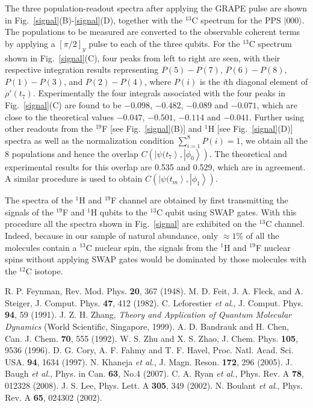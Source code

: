 \documentclass[twocolumn,showpacs,twoside,10pt,prl]{revtex4}
\begin{document}
 The three population-readout spectra after applying the GRAPE pulse
 are shown in Fig.~\ref{signal}(B)-\ref{signal}(D), together with the $^{13}$C spectrum for the PPS $|000\rangle$.
 The populations to be measured are converted to the observable coherent terms by applying a $[\pi/2]_y$ pulse to each of the three qubits.   For the $^{13}$C spectrum shown in Fig.~\ref{signal}(C), four peaks from left to right are seen, with their respective integration results representing $P(5)-P(7)$, $P(6)-P(8)$, $P(1)-P(3)$, and $P(2)-P(4)$, where $P(i)$ is the  \emph{i}th diagonal element of $\rho'(t_7)$.  Experimentally the four integrals associated with the four peaks in Fig.~\ref{signal}(C) are found to be $-0.098$, $-0.482$, $-0.089$ and $-0.071$, which are close to the theoretical values $-0.047$, $-0.501$, $-0.114$ and $-0.041$.
 Further using other readouts from the $^{19}$F [see Fig.~\ref{signal}(B)] and $^1$H [see Fig.~\ref{signal}(D)] spectra as well as the normalization condition $\sum_{i=1}^{8} {P}({i})=1$, we obtain all the 8 populations and hence the overlap $C(\left\vert \psi(t_{7} \right\rangle,\left\vert \phi_{0} \right\rangle)$.  The theoretical and experimental results for this overlap are 0.535 and 0.529, which are in agreement.
 A similar procedure is used to obtain $C(\left\vert \psi(t_{m} \right\rangle,\left\vert \phi_{1} \right\rangle)$.

 The spectra of the ${}^{1}$H and ${}^{19}$F channel are obtained by first transmitting the signals of the $^{19}$F and $^1$H qubits to the $^{13}$C qubit using SWAP gates. With this procedure all the spectra shown in Fig.~\ref{signal} are exhibited on the $^{13}$C channel.  Indeed, because
 in our sample of natural abundance, only $\approx 1\%$ of all the molecules contain a ${}^{13}$C nuclear spin,
 the signals from the ${}^{1}$H and ${}^{19}$F nuclear spins  without applying SWAP gates would be
  dominated by those molecules with the ${}^{12}$C isotope.




\begin{thebibliography}{99}
 R. P. Feynman, Rev. Mod. Phys. \textbf{20}, 367 (1948).
 M. D. Feit, J. A. Fleck, and A. Steiger, J. Comput. Phys. \textbf{47}, 412 (1982).
 C. Leforestier \emph{et al}., J. Comput. Phys. \textbf{94}, 59 (1991).
 J. Z. H. Zhang, {\it Theory and Application of Quantum Molecular Dynamics}
 (World Scientific, Singapore, 1999).
 A. D. Bandrauk and H. Chen, Can. J. Chem. {\bf 70}, 555 (1992).
 W. S. Zhu and X. S. Zhao, J. Chem. Phys. {\bf 105}, 9536 (1996).
 D. G. Cory, A. F. Fahmy and T. F. Havel, Proc. Natl. Acad. Sci. USA. \textbf{94}, 1634 (1997).
 N. Khaneja \emph{et al.}, J. Magn. Reson. \textbf{172}, 296 (2005).
 J. Baugh \emph{et al.}, Phys. in Can. \textbf{63}, No.4
(2007).
 C. A. Ryan \emph{et al.}, Phys. Rev. A \textbf{78}, 012328 (2008).
 J. S. Lee, Phys. Lett. A \textbf{305}, 349 (2002).
 N. Boulant \emph{et al}., Phys. Rev. A \textbf{65}, 024302 (2002).
\end{thebibliography}
\end{document}
